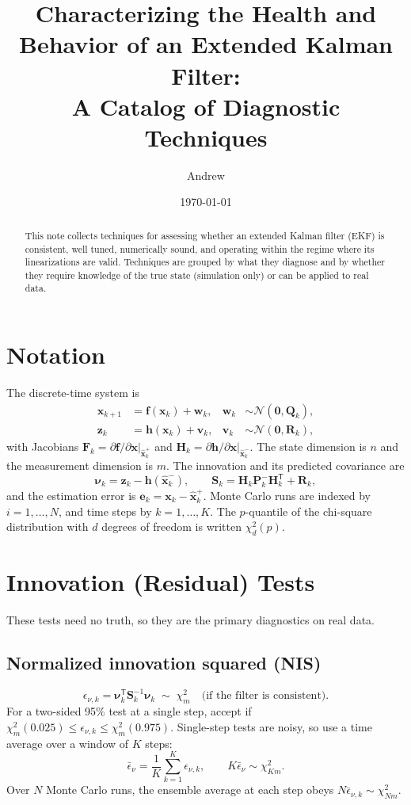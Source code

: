 \documentclass[11pt]{article}
\title{Characterizing the Health and Behavior of an Extended Kalman Filter:\\
A Catalog of Diagnostic Techniques}
\author{Andrew}
\date{\today}
\newcommand{\x}{\bm{x}}
\newcommand{\xhat}{\hat{\bm{x}}}
\newcommand{\e}{\bm{e}}
\newcommand{\nuv}{\bm{\nu}}
\newcommand{\Pm}{\bm{P}}
\newcommand{\Sm}{\bm{S}}
\newcommand{\Hm}{\bm{H}}
\newcommand{\Fm}{\bm{F}}
\newcommand{\Qm}{\bm{Q}}
\newcommand{\Rm}{\bm{R}}
\newcommand{\T}{^{\mathsf{T}}}
\newcommand{\chisq}[1]{\chi^2_{#1}}
\begin{document}
\maketitle

\begin{abstract}
This note collects techniques for assessing whether an extended Kalman filter (EKF) is
consistent, well tuned, numerically sound, and operating within the regime where its
linearizations are valid. Techniques are grouped by what they diagnose and by whether they
require knowledge of the true state (simulation only) or can be applied to real data.
\end{abstract}

\section*{Notation}
The discrete-time system is
\begin{align}
  \x_{k+1} &= \bm{f}(\x_k) + \bm{w}_k, & \bm{w}_k &\sim \mathcal{N}(\bm{0},\Qm_k),\\
  \bm{z}_k &= \bm{h}(\x_k) + \bm{v}_k, & \bm{v}_k &\sim \mathcal{N}(\bm{0},\Rm_k),
\end{align}
with Jacobians $\Fm_k = \partial \bm{f}/\partial\x|_{\xhat_k^+}$ and
$\Hm_k = \partial \bm{h}/\partial\x|_{\xhat_k^-}$. The state dimension is $n$ and the
measurement dimension is $m$. The innovation and its predicted covariance are
\begin{equation}
  \nuv_k = \bm{z}_k - \bm{h}(\xhat_k^-), \qquad
  \Sm_k = \Hm_k \Pm_k^- \Hm_k\T + \Rm_k,
\end{equation}
and the estimation error is $\e_k = \x_k - \xhat_k^+$. Monte Carlo runs are indexed by
$i = 1,\dots,N$, and time steps by $k = 1,\dots,K$. The $p$-quantile of the chi-square
distribution with $d$ degrees of freedom is written $\chisq{d}(p)$.

\section{Innovation (Residual) Tests}
\label{sec:innovation}
These tests need no truth, so they are the primary diagnostics on real data.

\subsection{Normalized innovation squared (NIS)}
\begin{equation}
  \epsilon_{\nu,k} = \nuv_k\T \Sm_k^{-1} \nuv_k \;\sim\; \chisq{m}
  \quad\text{(if the filter is consistent).}
\end{equation}
For a two-sided 95\% test at a single step, accept if
$\chisq{m}(0.025) \le \epsilon_{\nu,k} \le \chisq{m}(0.975)$.
Single-step tests are noisy, so use a time average over a window of $K$ steps:
\begin{equation}
  \bar{\epsilon}_\nu = \frac{1}{K}\sum_{k=1}^{K} \epsilon_{\nu,k},
  \qquad K\bar{\epsilon}_\nu \sim \chisq{Km}.
\end{equation}
Over $N$ Monte Carlo runs, the ensemble average at each step obeys
$N\bar{\epsilon}_{\nu,k} \sim \chisq{Nm}$.
\end{document}

